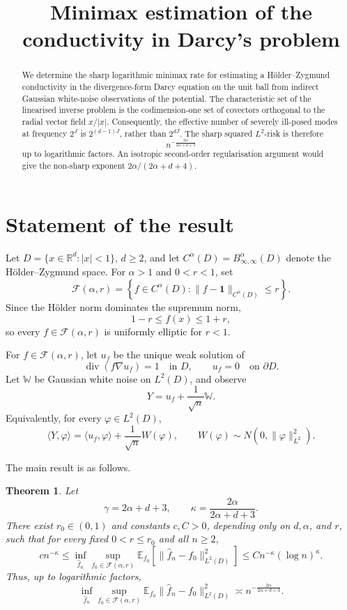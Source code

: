 \documentclass[11pt,a4paper]{article}
\title{Minimax estimation of the conductivity in Darcy's problem}
\date{}
\newtheorem{theorem}{Theorem}[section]
\theoremstyle{remark}
\numberwithin{equation}{section}
\newcommand{\R}{\mathbb{R}}
\newcommand{\E}{\mathbb{E}}
\newcommand{\W}{\mathbb{W}}
\newcommand{\bone}{\mathbf 1}
\newcommand{\Div}{\operatorname{div}}
\newcommand{\Fcal}{\mathcal F}
\begin{document}
\maketitle

\begin{abstract}
We determine the sharp logarithmic minimax rate for estimating a
H\"older--Zygmund conductivity in the divergence-form Darcy equation on the
unit ball from indirect Gaussian white-noise observations of the potential.
The characteristic set of the linearised inverse problem is the
codimension-one set of covectors orthogonal to the radial vector field
$x/|x|$. Consequently, the effective number of severely ill-posed modes at
frequency $2^J$ is $2^{(d-1)J}$, rather than $2^{dJ}$. The sharp squared
$L^2$-risk is therefore
\[
n^{-\frac{2\alpha}{2\alpha+d+3}}
\]
up to logarithmic factors. An isotropic second-order regularisation argument
would give the non-sharp exponent $2\alpha/(2\alpha+d+4)$.
\end{abstract}

\section{Statement of the result}

Let $D=\{x\in\R^d:|x|<1\}$, $d\geq 2$, and let
$C^\alpha(D)=B^\alpha_{\infty,\infty}(D)$ denote the H\"older--Zygmund
space. For $\alpha>1$ and $0<r<1$, set
\[
\Fcal(\alpha,r)
=
\left\{
f\in C^\alpha(D):\|f-\bone\|_{C^\alpha(D)}\leq r
\right\}.
\]
Since the H\"older norm dominates the supremum norm,
\[
1-r\leq f(x)\leq 1+r,
\]
so every $f\in\Fcal(\alpha,r)$ is uniformly elliptic for $r<1$.

For $f\in\Fcal(\alpha,r)$, let $u_f$ be the unique weak solution of
\begin{equation}\label{eq:Darcy}
\Div(f\nabla u_f)=1\quad\text{in }D,
\qquad
u_f=0\quad\text{on }\partial D.
\end{equation}
Let $\W$ be Gaussian white noise on $L^2(D)$, and observe
\begin{equation}\label{eq:model}
Y=u_f+\frac{1}{\sqrt n}\W.
\end{equation}
Equivalently, for every $\varphi\in L^2(D)$,
\[
\langle Y,\varphi\rangle
=
\langle u_f,\varphi\rangle+\frac1{\sqrt n}W(\varphi),
\qquad
W(\varphi)\sim N(0,\|\varphi\|_{L^2}^2).
\]

The main result is as follows.

\begin{theorem}\label{thm:main}
Let
\[
\gamma=2\alpha+d+3,
\qquad
\kappa=\frac{2\alpha}{2\alpha+d+3}.
\]
There exist $r_0\in(0,1)$ and constants $c,C>0$, depending only on
$d,\alpha$, and $r$, such that for every fixed $0<r\leq r_0$ and all
$n\geq 2$,
\begin{equation}\label{eq:rates}
c n^{-\kappa}
\leq
\inf_{\widehat f_n}
\sup_{f_0\in\Fcal(\alpha,r)}
\E_{f_0}\!\left[
\|\widehat f_n-f_0\|_{L^2(D)}^2
\right]
\leq
C n^{-\kappa}(\log n)^\kappa .
\end{equation}
Thus, up to logarithmic factors,
\[
\boxed{\;
\inf_{\widehat f_n}\sup_{f_0\in\Fcal(\alpha,r)}
\E_{f_0}\|\widehat f_n-f_0\|_{L^2(D)}^2
\asymp
n^{-\frac{2\alpha}{2\alpha+d+3}} .
\;}
\]
\end{theorem}
\end{document}
